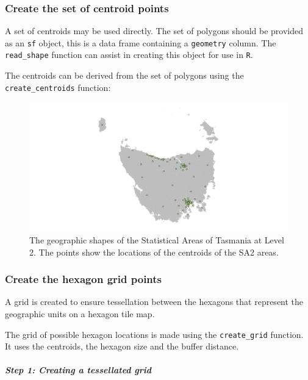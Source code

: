 \documentclass{monashthesis}
\begin{document}
\hypertarget{create-the-set-of-centroid-points}{%
\subsubsection{Create the set of centroid points}\label{create-the-set-of-centroid-points}}

A set of centroids may be used directly. The set of polygons should be provided as an \texttt{sf} object, this is a data frame containing a \texttt{geometry} column. The \texttt{read\_shape} function can assist in creating this object for use in \texttt{R}.

The centroids can be derived from the set of polygons using the \texttt{create\_centroids} function:

\begin{figure}[H]
\centering
\includegraphics[width=16cm]{figures/03-algorithm/1centroids.png}
\caption{\label{fig:centroids_plot}The geographic shapes of the Statistical Areas of Tasmania at Level 2. The points show the locations of the centroids of the SA2 areas.}
\end{figure}

\hypertarget{create-the-hexagon-grid-points}{%
\subsubsection{Create the hexagon grid points}\label{create-the-hexagon-grid-points}}

A grid is created to ensure tessellation between the hexagons that represent the geographic units on a hexagon tile map.

The grid of possible hexagon locations is made using the \texttt{create\_grid} function.
It uses the centroids, the hexagon size and the buffer distance.

\hypertarget{step-1-creating-a-tessellated-grid}{%
\subparagraph{Step 1: Creating a tessellated grid}\label{step-1-creating-a-tessellated-grid}}
\end{document}
